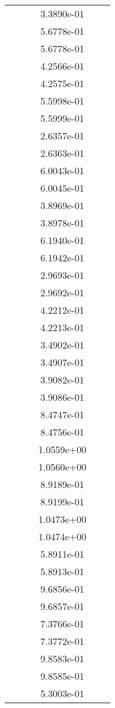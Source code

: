 \begin{xltabular}{\textwidth}{r|rS[table-format=1.3e+2]S[table-format=1.4e+2]S[table-format=1.4e+2]S[table-format=-1.5]}
&  &  & 3.3890e-01 & & \\
&  &  & 5.6778e-01 & & \\
&  &  & 5.6778e-01 & & \\
&  &  & 4.2566e-01 & & \\
&  &  & 4.2575e-01 & & \\
&  &  & 5.5998e-01 & & \\
&  &  & 5.5999e-01 & & \\
&  &  & 2.6357e-01 & & \\
&  &  & 2.6363e-01 & & \\
&  &  & 6.0043e-01 & & \\
&  &  & 6.0045e-01 & & \\
&  &  & 3.8969e-01 & & \\
&  &  & 3.8978e-01 & & \\
&  &  & 6.1940e-01 & & \\
&  &  & 6.1942e-01 & & \\
&  &  & 2.9693e-01 & & \\
&  &  & 2.9692e-01 & & \\
&  &  & 4.2212e-01 & & \\
&  &  & 4.2213e-01 & & \\
&  &  & 3.4902e-01 & & \\
&  &  & 3.4907e-01 & & \\
&  &  & 3.9082e-01 & & \\
&  &  & 3.9086e-01 & & \\
&  &  & 8.4747e-01 & & \\
&  &  & 8.4756e-01 & & \\
&  &  & 1.0559e+00 & & \\
&  &  & 1.0560e+00 & & \\
&  &  & 8.9189e-01 & & \\
&  &  & 8.9199e-01 & & \\
&  &  & 1.0473e+00 & & \\
&  &  & 1.0474e+00 & & \\
&  &  & 5.8911e-01 & & \\
&  &  & 5.8913e-01 & & \\
&  &  & 9.6856e-01 & & \\
&  &  & 9.6857e-01 & & \\
&  &  & 7.3766e-01 & & \\
&  &  & 7.3772e-01 & & \\
&  &  & 9.8583e-01 & & \\
&  &  & 9.8585e-01 & & \\
&  &  & 5.3003e-01 & & \\

\end{xltabular}
